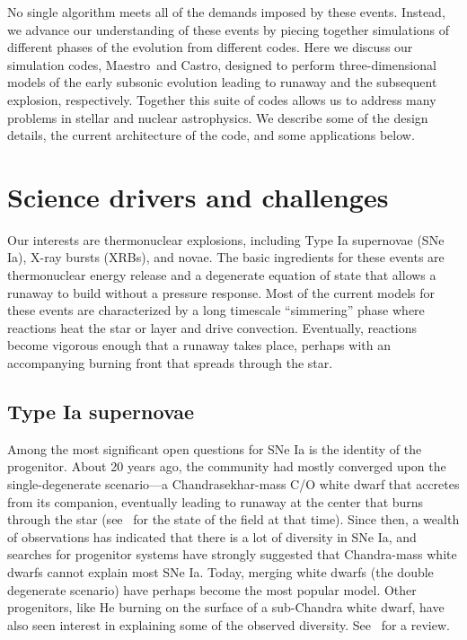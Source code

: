 \documentclass[a4paper]{jpconf}
\newcommand{\maestro}{{\sffamily Maestro}}
\newcommand{\castro}{{\sffamily Castro}}
\begin{document}
No single algorithm meets all of the demands imposed by these events.
Instead, we advance our understanding of these events by piecing
together simulations of different phases of the evolution from
different codes.  Here we discuss our simulation codes, \maestro\ and
\castro, designed to perform three-dimensional models of the early
subsonic evolution leading to runaway and the subsequent explosion,
respectively.  Together this suite of codes allows us to address many
problems in stellar and nuclear astrophysics.  We describe some of the
design details, the current architecture of the code, and some
applications below.

\section{Science drivers and challenges}

Our interests are thermonuclear explosions, including Type Ia
supernovae (SNe Ia), X-ray bursts (XRBs), and novae.  The basic
ingredients for these events are thermonuclear energy release and a
degenerate equation of state that allows a runaway to build without a
pressure response.  Most of the current models for these events are
characterized by a long timescale ``simmering'' phase where reactions
heat the star or layer and drive convection.  Eventually, reactions
become vigorous enough that a runaway takes place, perhaps with an
accompanying burning front that spreads through the star.

\subsection{Type Ia supernovae}

Among the most significant open questions for SNe Ia is the identity of the
progenitor.  About 20 years ago, the community had
mostly converged upon the single-degenerate scenario---a
Chandrasekhar-mass C/O white dwarf that accretes from its companion,
eventually leading to runaway at the center that burns through the
star (see~\cite{hillebrandtniemeyer2000} for the state of the field at
that time).  Since then, a wealth of observations has indicated that
there is a lot of diversity in SNe Ia, and searches for progenitor
systems have strongly suggested that Chandra-mass white dwarfs cannot
explain most SNe Ia.  Today, merging white dwarfs (the double
degenerate scenario) have perhaps become the most popular model.
Other progenitors, like He burning on the surface of a sub-Chandra
white dwarf, have also seen interest in explaining some of the observed
diversity.  See~\cite{araa-maoz} for a review.
\end{document}
